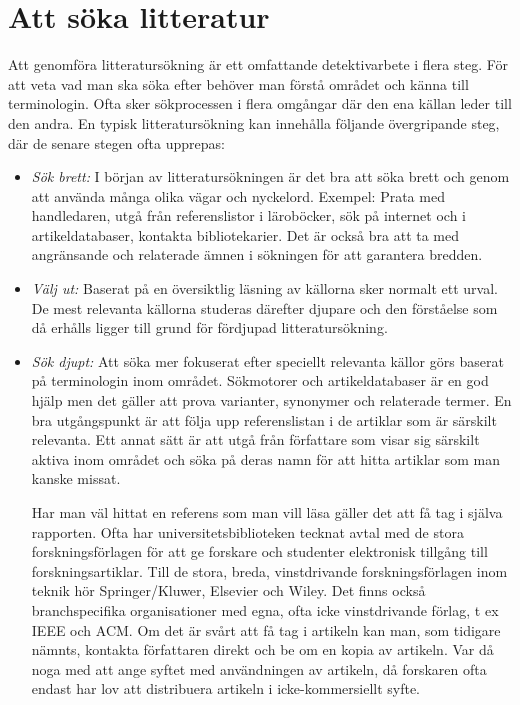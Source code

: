 \section{Att söka litteratur}\label{att-suxf6ka-litteratur}

Att genomföra litteratursökning är ett omfattande detektivarbete i flera
steg. För att veta vad man ska söka efter behöver man förstå området och
känna till terminologin. Ofta sker sökprocessen i flera omgångar där den
ena källan leder till den andra. En typisk litteratursökning kan
innehålla följande övergripande steg, där de senare stegen ofta
upprepas:

\begin{itemize}
\item
  \emph{Sök brett:} I början av litteratursökningen är det bra att söka
  brett och genom att använda många olika vägar och nyckelord. Exempel:
  Prata med handledaren, utgå från referenslistor i läroböcker, sök på
  internet och i artikeldatabaser, kontakta bibliotekarier. Det är också
  bra att ta med angränsande och relaterade ämnen i sökningen för att
  garantera bredden.
\item
  \emph{Välj ut:} Baserat på en översiktlig läsning av källorna sker
  normalt ett urval. De mest relevanta källorna studeras därefter
  djupare och den förståelse som då erhålls ligger till grund för
  fördjupad litteratursökning.
\item
  \emph{Sök djupt:} Att söka mer fokuserat efter speciellt relevanta
  källor görs baserat på terminologin inom området. Sökmotorer och
  artikeldatabaser är en god hjälp men det gäller att prova varianter,
  synonymer och relaterade termer. En bra utgångspunkt är att följa upp
  referenslistan i de artiklar som är särskilt relevanta. Ett annat sätt
  är att utgå från författare som visar sig särskilt aktiva inom området
  och söka på deras namn för att hitta artiklar som man kanske missat.

  Har man väl hittat en referens som man vill läsa gäller det att få tag
  i själva rapporten. Ofta har universitetsbiblioteken tecknat avtal med
  de stora forskningsförlagen för att ge forskare och studenter
  elektronisk tillgång till forskningsartiklar. Till de stora, breda,
  vinstdrivande forskningsförlagen inom teknik hör Springer/Kluwer,
  Elsevier och Wiley. Det finns också branchspecifika organisationer med
  egna, ofta icke vinstdrivande förlag, t ex IEEE och ACM. Om det är
  svårt att få tag i artikeln kan man, som tidigare nämnts, kontakta
  författaren direkt och be om en kopia av artikeln. Var då noga med att
  ange syftet med användningen av artikeln, då forskaren ofta endast har
  lov att distribuera artikeln i icke-kommersiellt syfte.


\end{itemize}
